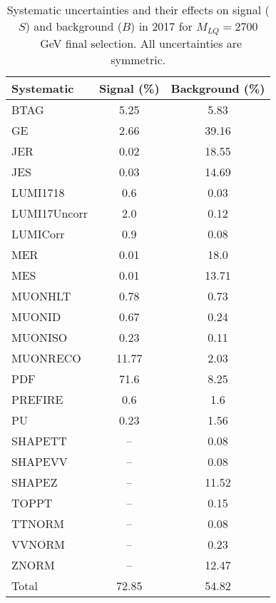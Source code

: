 \begin{table}[htbp]
\begin{center}
\caption{Systematic uncertainties and their effects on signal ($S$) and background ($B$) in 2017 for $M_{LQ}=2700$~GeV final selection. All uncertainties are symmetric.}
\begin{tabular}{lcc}
\hline\hline
Systematic & Signal (\%) & Background (\%) \\ \hline 
BTAG & 5.25 & 5.83\\ 
GE & 2.66 & 39.16\\ 
JER & 0.02 & 18.55\\ 
JES & 0.03 & 14.69\\ 
LUMI1718 & 0.6 & 0.03\\ 
LUMI17Uncorr & 2.0 & 0.12\\ 
LUMICorr & 0.9 & 0.08\\ 
MER & 0.01 & 18.0\\ 
MES & 0.01 & 13.71\\ 
MUONHLT & 0.78 & 0.73\\ 
MUONID & 0.67 & 0.24\\ 
MUONISO & 0.23 & 0.11\\ 
MUONRECO & 11.77 & 2.03\\ 
PDF & 71.6 & 8.25\\ 
PREFIRE & 0.6 & 1.6\\ 
PU & 0.23 & 1.56\\ 
SHAPETT & -- & 0.08\\ 
SHAPEVV & -- & 0.08\\ 
SHAPEZ & -- & 11.52\\ 
TOPPT & -- & 0.15\\ 
TTNORM & -- & 0.08\\ 
VVNORM & -- & 0.23\\ 
ZNORM & -- & 12.47\\ 
Total & 72.85 & 54.82\\ \hline \hline
\end{tabular}
\label{tab:SysUncertainties_uujj_2700}
\end{center}
\end{table}

